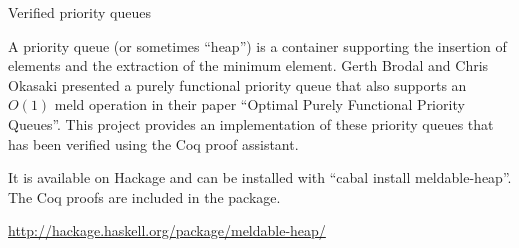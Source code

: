\documentclass{scrreprt}
\begin{document}
\begin{hcarentry}{Verified priority queues}
\makeheader

A priority queue (or sometimes ``heap'') is a container supporting the insertion of elements and the extraction of the minimum element.
Gerth Brodal and Chris Okasaki presented a purely functional priority queue that also supports an $O(1)$ meld operation in their paper ``Optimal Purely Functional Priority Queues''.
This project provides an implementation of these priority queues that has been verified using the Coq proof assistant.

It is available on Hackage and can be installed with ``cabal install meldable-heap''. 
The Coq proofs are included in the package.

\FurtherReading
  \url{http://hackage.haskell.org/package/meldable-heap/}
\end{hcarentry}
\end{document}
